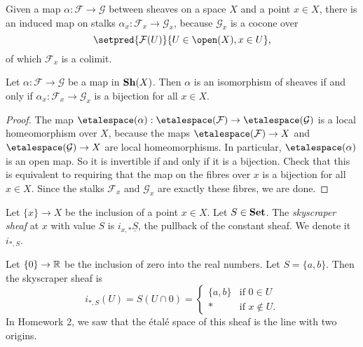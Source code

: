 Given a map $\alpha\colon \mathcal{F} \to \mathcal{G}$ between sheaves on a space $X$ and a point $x \in X$, there is an induced map on stalks $\alpha_x\colon \mathcal{F}_x \to \mathcal{G}_x$, because $\mathcal{G}_x$ is a cocone over
\[\setpred{\mathcal{F}(U)}{U \in \open(X),x \in U}\text{,}\]
of which $\mathcal{F}_x$ is a colimit. 

\begin{lem}
    Let $\alpha\colon \mathcal{F} \to \mathcal{G}$ be a map in $\operatorname{\mathbf{Sh}}(X)$. 
    Then $\alpha$ is an isomorphism of sheaves if and only if $\alpha_x\colon \mathcal{F}_x \to \mathcal{G}_x$ is a bijection for all $x \in X$. 
\end{lem}
\begin{proof}
    The map $\etalespace(\alpha)\colon \etalespace(\mathcal{F}) \to \etalespace(\mathcal{G})$ is a local homeomorphism over $X$, because the maps $\etalespace(\mathcal{F}) \to X$ and $\etalespace(\mathcal{G}) \to X$ are local homeomorphisms. In particular, $\etalespace(\alpha)$ is an open map. So it is invertible if and only if it is a bijection. Check that this is equivalent to requiring that the map on the fibres over $x$ is a bijection for all $x \in X$. Since the stalks $\mathcal{F}_x$ and $\mathcal{G}_x$ are exactly these fibres, we are done. 
\end{proof}

\begin{defn}
    Let $\{x\} \to X$ be the inclusion of a point $x \in X$. Let $S \in \mathbf{Set}$. The \emph{skyscraper sheaf} at $x$ with value $S$ is $i_{x,*}\underline{S}$, the pullback of the constant sheaf. We denote it $i_{*, S}$.
\end{defn}

\begin{exmp}
    Let $\{0\} \to \mathbb{R}$ be the inclusion of zero into the real numbers. Let $S = \{a,b\}$. Then the skyscraper sheaf is 
    \[
        i_{*,S}(U) = S(U \cap 0) =     \begin{cases}
        \{a,b\} & \text{if } 0 \in U\\
        * & \text{if } x \notin U.
    \end{cases}
    \]
    In Homework 2, we saw that the étalé space of this sheaf is the line with two origins. 
\end{exmp}